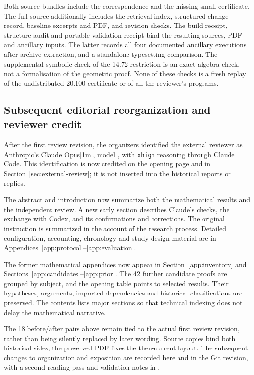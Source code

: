 Both source bundles include the correspondence and the missing small
certificate. The full source additionally includes the retrieval index,
structured change record, baseline excerpts and PDF, and revision checks.
The build receipt, structure audit and portable-validation receipt bind
the resulting sources, PDF and ancillary inputs. The latter records all
four documented ancillary executions after archive extraction, and a
standalone typesetting comparison. The supplemental symbolic check of
the 14.72 restriction is an exact algebra check, not a formalisation of
the geometric proof. None of these checks is a fresh replay of the
undistributed 20.100 certificate or of all the reviewer's programs.

\subsection{Subsequent editorial reorganization and reviewer credit}
After the first review revision, the organizers identified the external
reviewer as Anthropic's Claude Opus[1m], model
, with \texttt{xhigh} reasoning through Claude
Code. This identification is now credited on the opening page and in
Section~\ref{sec:external-review}; it is not inserted into the historical
reports or replies.

The abstract and introduction now summarize both the mathematical results
and the independent review. A new early section describes Claude's checks,
the exchange with Codex, and its confirmations and corrections. The
original instruction is summarized in the account of the research process.
Detailed configuration, accounting, chronology and study-design material
are in Appendices~\ref{app:protocol}--\ref{app:evaluation}.

The former mathematical appendices now appear in
Section~\ref{app:inventory} and
Sections~\ref{app:candidates}--\ref{app:prior}. The 42 further candidate
proofs are grouped by subject, and the opening table points to selected
results. Their hypotheses, arguments, imported dependencies and historical
classifications are preserved. The contents lists major sections so that
technical indexing does not delay the mathematical narrative.

The 18 before/after pairs above remain tied to the actual first review
revision, rather than being silently replaced by later wording.
Source copies bind both historical sides; the preserved PDF fixes the
then-current layout. The subsequent changes to organization and exposition
are recorded here and in the Git revision, with a second reading pass and
validation notes in .

